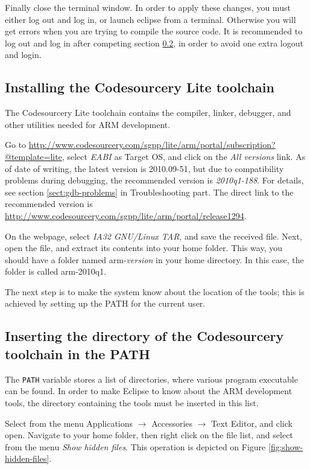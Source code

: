 \documentclass[a4paper, 10pt]{article}
\begin{document}
Finally close the terminal window.
In order to apply these changes, you must either log out and log in,
or launch eclipse from a terminal.
Otherwise you will get errors when you are trying to compile the source code.
It is recommended to log out and log in after
competing section \ref{sect:change-path}, in order to avoid one extra logout and login.

\subsection{Installing the Codesourcery Lite toolchain}

The Codesourcery Lite toolchain contains
the compiler, linker, debugger, and other utilities needed for
ARM development.

Go to
\url{http://www.codesourcery.com/sgpp/lite/arm/portal/subscription?@template=lite},
select \emph{EABI} as Target OS, and click on the
\emph{All versions} link.
As of date of writing, the latest version is 2010.09-51, but
due to compatibility problems during debugging, the recommended version is \emph{2010q1-188}.
For details, see section \ref{sect:gdb-problems} in Troubleshooting part.
The direct link to the recommended version is
\url{http://www.codesourcery.com/sgpp/lite/arm/portal/release1294}.

On the webpage, select \emph{IA32 GNU/Linux TAR},
and save the received file.
Next, open the file, and extract its contents into your home folder.
This way, you should have a folder named arm-\textit{version} in your home directory.
In this case, the folder is called arm-2010q1.

The next step is to make the system know about the location of the tools;
this is achieved by setting up the PATH for the current user.

\subsection{Inserting the directory of the Codesourcery toolchain in the PATH}

    \label{sect:change-path}
The \verb+PATH+ variable stores a list of directories, where various
program executable can be found. In order to make Eclipse to know about the
ARM development tools, the directory containing the tools must be inserted
in this list.

Select from the menu Applications $\rightarrow$ Accessories $\rightarrow$ Text Editor,
and click open. Navigate to your home folder, then right click on the file list,
and select from the menu \emph{Show hidden files}. This operation is depicted on Figure
\ref{fig:show-hidden-files}.
\end{document}

